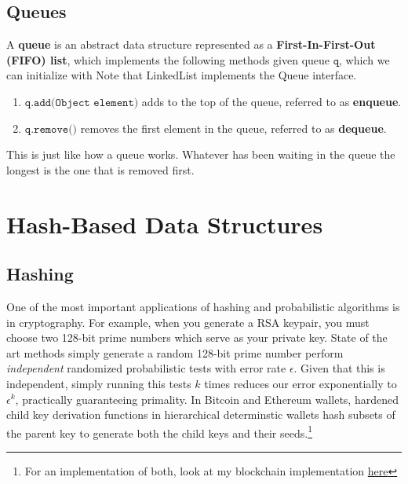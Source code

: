 \documentclass{article}
\begin{document}
  \subsection{Queues}

    \begin{definition}[Queue]
      A \textbf{queue} is an abstract data structure represented as a \textbf{First-In-First-Out (FIFO) list}, which implements the following methods given queue $\texttt{q}$, which we can initialize with Note that LinkedList implements the Queue interface. 
      \begin{enumerate}
          \item $\texttt{q.add(Object element)}$ adds to the top of the queue, referred to as \textbf{enqueue}. 
          \item $\texttt{q.remove()}$ removes the first element in the queue, referred to as \textbf{dequeue}. 
      \end{enumerate}
      This is just like how a queue works. Whatever has been waiting in the queue the longest is the one that is removed first. 
    \end{definition}

\section{Hash-Based Data Structures} 

  \subsection{Hashing}

    One of the most important applications of hashing and probabilistic algorithms is in cryptography. For example, when you generate a RSA keypair, you must choose two 128-bit prime numbers which serve as your private key. State of the art methods simply generate a random 128-bit prime number perform \textit{independent} randomized probabilistic tests with error rate $\epsilon$. Given that this is independent, simply running this tests $k$ times reduces our error exponentially to $\epsilon^k$, practically guaranteeing primality. In Bitcoin and Ethereum wallets, hardened child key derivation functions in hierarchical determinstic wallets hash subsets of the parent key to generate both the child keys and their seeds.\footnote{For an implementation of both, look at my blockchain implementation \href{https://github.com/mbahng/blade/blob/main/backend/src/crypt/primes.js\#L61}{here}} 
\end{document}

